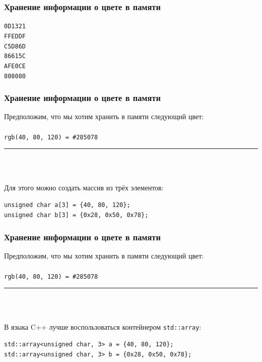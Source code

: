 \documentclass[10pt,pdf,hyperref={unicode}]{beamer}
\begin{document}
\begin{frame}[fragile]
\frametitle{Хранение информации о цвете в памяти} 
\raggedleft
\texttt{0D1321}		\textcolor[HTML]{0D1321}{\cbox}\\
\texttt{FFEDDF}		\textcolor[HTML]{FFEDDF}{\cbox}\\
\texttt{C5D86D}		\textcolor[HTML]{C5D86D}{\cbox}\\
\texttt{86615C}		\textcolor[HTML]{86615C}{\cbox}\\
\texttt{AFE0CE}		\textcolor[HTML]{AFE0CE}{\cbox}\\
\texttt{808080}	\textcolor[HTML]{808080}{\cbox}\\
\end{frame}


\begin{frame}[fragile]
\frametitle{Хранение информации о цвете в памяти}
\newcommand{\cboxx}{\hspace{9mm}\rule[-1mm]{40mm}{5mm}}

Предположим, что мы хотим хранить в памяти следующий цвет:\\
\hfill\\
\raggedleft
\texttt{rgb(40, 80, 120) = \#285078}	\textcolor[HTML]{285078}{\cboxx}\\
\raggedright

\hfill\\
Для этого можно создать массив из трёх элементов:\\
\begin{lstlisting}
unsigned char a[3] = {40, 80, 120};
unsigned char b[3] = {0x28, 0x50, 0x78};
\end{lstlisting}
\end{frame}


\begin{frame}[fragile]
\frametitle{Хранение информации о цвете в памяти}
\newcommand{\cboxx}{\hspace{9mm}\rule[-1mm]{40mm}{5mm}}

Предположим, что мы хотим хранить в памяти следующий цвет:\\
\hfill\\
\raggedleft
\texttt{rgb(40, 80, 120) = \#285078}	\textcolor[HTML]{285078}{\cboxx}\\
\raggedright

\hfill\\
В языка C++ лучше воспользоваться контейнером \texttt{std::array}:\\
\begin{lstlisting}
std::array<unsigned char, 3> a = {40, 80, 120};
std::array<unsigned char, 3> b = {0x28, 0x50, 0x78};
\end{lstlisting}
\end{frame}
\end{document}
